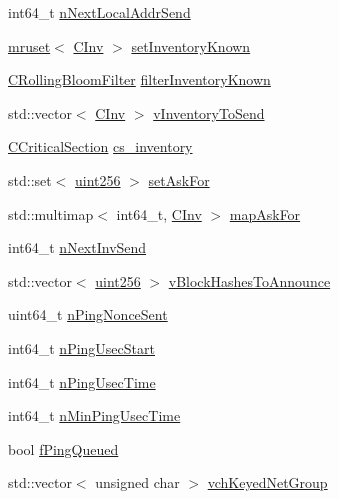 \begin{DoxyCompactItemize}
\item 
int64\+\_\+t \mbox{\hyperlink{class_c_node_af627cc9fe0654487aed7b4224d78ad24}{n\+Next\+Local\+Addr\+Send}}
\item 
\mbox{\hyperlink{classmruset}{mruset}}$<$ \mbox{\hyperlink{class_c_inv}{C\+Inv}} $>$ \mbox{\hyperlink{class_c_node_ae15aa9a971040800c26bc87b1250220f}{set\+Inventory\+Known}}
\item 
\mbox{\hyperlink{class_c_rolling_bloom_filter}{C\+Rolling\+Bloom\+Filter}} \mbox{\hyperlink{class_c_node_a09fbd8c77f6be2b8d4b309c703ce2e13}{filter\+Inventory\+Known}}
\item 
std\+::vector$<$ \mbox{\hyperlink{class_c_inv}{C\+Inv}} $>$ \mbox{\hyperlink{class_c_node_abcd24c9478bc1ab5ba6de6b369080cec}{v\+Inventory\+To\+Send}}
\item 
\mbox{\hyperlink{sync_8h_a37a4692b2d517f2843655ca11af7668a}{C\+Critical\+Section}} \mbox{\hyperlink{class_c_node_a1e8b0784cc82f33edc2dc4e2834d1ff0}{cs\+\_\+inventory}}
\item 
std\+::set$<$ \mbox{\hyperlink{classuint256}{uint256}} $>$ \mbox{\hyperlink{class_c_node_a9c8fd0d0ef6e26896c53380e6d6bf331}{set\+Ask\+For}}
\item 
std\+::multimap$<$ int64\+\_\+t, \mbox{\hyperlink{class_c_inv}{C\+Inv}} $>$ \mbox{\hyperlink{class_c_node_a7593dfbd76c34a81169e3fb2aa0e0cf7}{map\+Ask\+For}}
\item 
int64\+\_\+t \mbox{\hyperlink{class_c_node_a89226be680d821f4eef8fa391f4b4b6a}{n\+Next\+Inv\+Send}}
\item 
std\+::vector$<$ \mbox{\hyperlink{classuint256}{uint256}} $>$ \mbox{\hyperlink{class_c_node_ad47e8171d8a114592e90d7d83ee62875}{v\+Block\+Hashes\+To\+Announce}}
\item 
uint64\+\_\+t \mbox{\hyperlink{class_c_node_a9a077fbd09ddee1d81f027bc01a4ec68}{n\+Ping\+Nonce\+Sent}}
\item 
int64\+\_\+t \mbox{\hyperlink{class_c_node_a8352aa332af726ff117fb890c4dd3869}{n\+Ping\+Usec\+Start}}
\item 
int64\+\_\+t \mbox{\hyperlink{class_c_node_ada34ffe1700a5dafb57de7c4d2491844}{n\+Ping\+Usec\+Time}}
\item 
int64\+\_\+t \mbox{\hyperlink{class_c_node_a4d077afd5c600b9e3241abce4df60722}{n\+Min\+Ping\+Usec\+Time}}
\item 
bool \mbox{\hyperlink{class_c_node_aa1e9c1dc1d5cf806b9be0af155c0bf90}{f\+Ping\+Queued}}
\item 
std\+::vector$<$ unsigned char $>$ \mbox{\hyperlink{class_c_node_a656cd9e578e6e1ee07c8b7064302f789}{vch\+Keyed\+Net\+Group}}
\end{DoxyCompactItemize}
